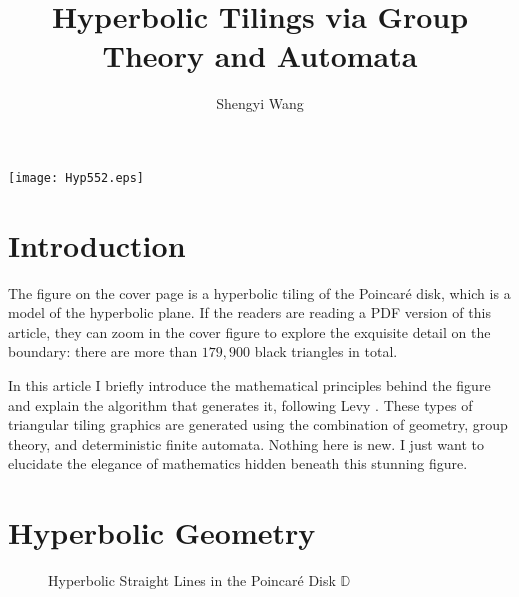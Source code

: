 \documentclass[12pt]{article}
\title{Hyperbolic Tilings via Group Theory and Automata}
\author{Shengyi Wang}
\affil{Princeton University}
\begin{document}
\maketitle

\begin{center}
  \texttt{[image: Hyp552.eps]}
\end{center}

\section{Introduction}

The figure on the cover page is a hyperbolic tiling of the Poincar\'e
disk, which is a model of the hyperbolic plane. If the readers are
reading a PDF version of this article, they can zoom in the cover
figure to explore the exquisite detail on the boundary: there are more
than $179,900$ black triangles in total.

In this article I briefly introduce the mathematical principles behind
the figure and explain the algorithm that generates it, following Levy
\citep{silvio1992}. These types of triangular tiling graphics are
generated using the combination of geometry, group theory, and
deterministic finite automata. Nothing here is new. I just want to
elucidate the elegance of mathematics hidden beneath this stunning
figure.

\section{Hyperbolic Geometry}
\begin{figure}[htbp]
  \centering
  \caption{Hyperbolic Straight Lines in the Poincar\'e Disk $\mathbb{D}$}
  \label{fig:hyplines}
\end{figure}
\end{document}
